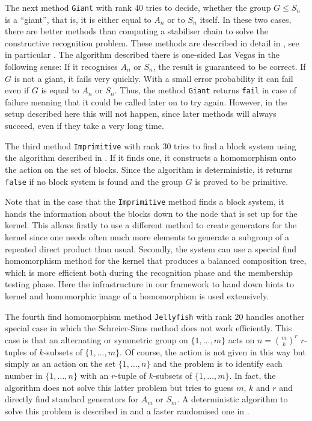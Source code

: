 The next method \texttt{Giant} with rank $40$ tries to decide, whether the
group $G \le S_n$ is a ``giant'', that is, it is either equal to
$A_n$ or to $S_n$ itself. In these two cases, there are better methods than
computing a stabiliser chain to solve the constructive recognition problem.
These methods are described in detail in \cite[Section~10.2]{Ser}, see
in particular \cite[Section~10.2.4]{Ser}. The algorithm described there
is one-sided Las Vegas in the following sense:  If it recognises $A_n$ or
$S_n$, the result is guaranteed to be correct. If $G$ is not a giant, it
fails very quickly. With a small error probability it can fail even if
$G$ is equal to $A_n$ or $S_n$. Thus, the method \texttt{Giant} returns
\texttt{fail} in case of failure meaning that it could be called later
on to try again. However, in the setup described here this will not
happen, since later methods will always succeed, even if they take a
very long time.

The third method \texttt{Imprimitive} with rank $30$ tries to find a block
system using the algorithm described in \cite[Section~5.5.1]{Ser}. If it 
finds one, it constructs a homomorphism onto the action on the set of
blocks. Since the algorithm is deterministic, it returns \texttt{false}
if no block system is found and the group $G$ is proved to be primitive.

Note that in the case that the \texttt{Imprimitive} method finds a block
system, it hands the information about the blocks down to the node that is
set up for the kernel. This allows firstly to use a different method to
create generators for the kernel since one needs often much more elements
to generate a subgroup of a repeated direct product than usual. Secondly,
the system can use a special find homomorphism
method for the kernel that produces a balanced composition tree, which 
%
is more efficient both during the recognition phase and the membership
testing phase. Here the infrastructure in our framework to hand down 
hints to kernel and homomorphic image of a homomorphism is used 
%
extensively.

The fourth find homomorphism method \texttt{Jellyfish} with rank $20$
handles another special case in which the Schreier-Sims method does
not work efficiently. This case is that an alternating or symmetric
group on $\{1,\ldots,m\}$ acts on $n = {m \choose k}^r$ $r$-tuples
of $k$-subsets of $\{1,\ldots,m\}$. Of course, the action is not
given in this way but simply as an action on the set $\{1,\ldots,n\}$
and the problem is to identify each number in $\{1,\ldots,n\}$ with
an $r$-tuple of $k$-subsets of $\{ 1, \ldots, m\}$. In fact, the
algorithm does not solve this latter problem but tries to guess
$m$, $k$ and $r$ and directly find standard generators for $A_m$ or
$S_m$. A deterministic algorithm to solve this problem is described
in \cite[Section~4]{fastmanag} and a faster randomised one in
\cite{Jellyfish}.

